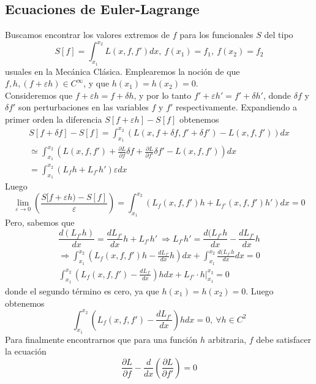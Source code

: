 \documentclass[12pt]{report}
\begin{document}
\subsection{Ecuaciones de Euler-Lagrange}
Buscamos encontrar los valores extremos de $f$ para los funcionales $S$ del tipo
\begin{equation}
S[f]=\int_{x_1}^{x_2}L(x,f,f')dx,\ f(x_1)=f_1,\ f(x_2)=f_2
\end{equation}
usuales en la Mecánica Clásica. Emplearemos la noción de que $f,h,(f+\varepsilon h)\in\mathit{C}^\infty$, y que $h(x_1)=h(x_2)=0$.\\
Consideremos que $f+\varepsilon h=f+\delta h$, y por lo tanto $f'+\varepsilon h'=f'+\delta h'$, donde $\delta f$ y $\delta f'$ son perturbaciones en las variables $f$ y $f'$ respectivamente. Expandiendo a primer orden la diferencia $S[f+\varepsilon h]-S[f]$ obtenemos
\begin{eqnarray}
S[f+\delta f]-S[f]=\int_{x_1}^{x_2}(L(x,f+\delta f, f'+\delta f')-L(x,f,f'))dx \\
\simeq\int_{x_1}^{x_2}(L(x,f,f')+\frac{\partial L}{\partial f}\delta f+\frac{\partial L}{\partial f'}\delta f'-L(x,f,f'))dx\\
=\int_{x_1}^{x_2}(L_f h+L_{f'}h')\varepsilon dx
\end{eqnarray}
Luego
\begin{equation}
\lim_{\varepsilon\rightarrow 0}\left(\frac{S[f+\varepsilon h)-S[f]}{\varepsilon}\right)=\int_{x_1}^{x_2}(L_f(x,f,f')h+L_{f'}(x,f,f')h')dx=0
\end{equation}
Pero, sabemos que
\begin{equation}
\frac{d(L_{f'}h)}{dx}=\frac{dL_{f'}}{dx}h+L_{f'}h'\ \Rightarrow L_{f'}h'=\frac{d(L_{f'}h}{dx}-\frac{dL_{f'}}{dx}h
\end{equation}
\begin{eqnarray}
\Rightarrow \int_{x_1}^{x_2}\left(L_f(x,f,f')h-\frac{dL_{f'}}{dx}h\right)dx+\int_{x_1}^{x_2}\frac{d(L_{f'}h}{dx}dx=0 \\
\int_{x_1}^{x_2}\left(L_f(x,f,f')-\frac{dL_{f'}}{dx}\right)hdx+L_{f'}\cdot h\vert_{x_1}^{x_2}=0
\end{eqnarray}
donde el segundo término es cero, ya que $h(x_1)=h(x_2)=0$. Luego obtenemos
\begin{equation}
\int_{x_1}^{x_2}\left(L_f(x,f,f')-\frac{dL_{f'}}{dx}\right)hdx=0,\ \forall h\in\mathit{C}^2
\end{equation}
Para finalmente encontrarnos que para una función $h$ arbitraria, $f$ debe satisfacer la ecuación
\begin{equation}
\frac{\partial L}{\partial f}-\frac{d}{dx}\left(\frac{\partial L}{\partial f'}\right)=0
\end{equation}
\end{document}

